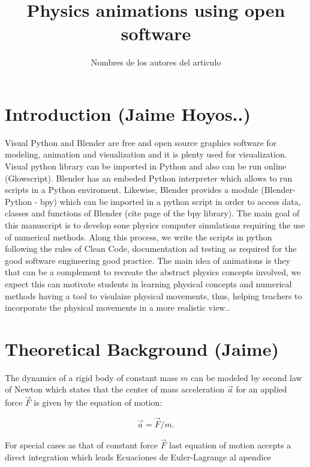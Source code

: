 \documentclass[12pt, letterpaper]{article}
\begin{document}
\title{Physics animations using open software}
\maketitle %
\author{Nombres de los autores del articulo}


\section{Introduction (Jaime Hoyos..)} 

Visual Python and Blender are free and open source graphics software for modeling, animation and visualization and it is plenty used for visualization. Visual python library can be imported in Python and also can be run online (Glowscript). Blender has an embeded Python interpreter which allows to run scripts in a Python enviroment. Likewise, Blender provides a module (Blender-Python - bpy) which can be imported in a python script in order to access data, classes and functions of Blender (cite page of the bpy library). The main goal of this manuscript is to develop sone physics computer simulations requiring the use of numerical methods. Along this process, we write the scripts in python following the rules of Clean Code, documentation ad testing as required for the good software engineering good practice. The main idea of animations is they that can be a complement to recreate the abstract physics concepts involved, we expect this can motivate students in learning physical concepts and numerical methods having a tool to visulaize physical movements, thus, helping teachers to incorporate the physical movements in a more realistic view..

\section{Theoretical Background (Jaime)}

The dynamics of a rigid body of constant mass $m$ can be modeled by second law of Newton which states that the center of mass acceleration $\vec{a}$ for an applied force $\vec{F}$ is given by the equation of motion:

\begin{equation}
\vec{a}=\vec{F}/m.
\end{equation}

For special cases as that of constant force $\vec{F}$ last equation of motion accepts a direct integration which leads 
Ecuaciones de Euler-Lagrange al apendice
\end{document}
